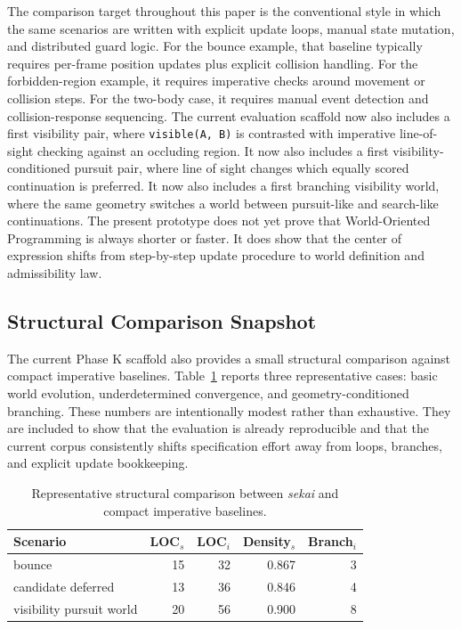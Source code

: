 The comparison target throughout this paper is the conventional style in which the same scenarios are written with explicit update loops, manual state mutation, and distributed guard logic.
For the bounce example, that baseline typically requires per-frame position updates plus explicit collision handling.
For the forbidden-region example, it requires imperative checks around movement or collision steps.
For the two-body case, it requires manual event detection and collision-response sequencing.
The current evaluation scaffold now also includes a first visibility pair, where \texttt{visible(A, B)} is contrasted with imperative line-of-sight checking against an occluding region.
It now also includes a first visibility-conditioned pursuit pair, where line of sight changes which equally scored continuation is preferred.
It now also includes a first branching visibility world, where the same geometry switches a world between pursuit-like and search-like continuations.
The present prototype does not yet prove that World-Oriented Programming is always shorter or faster.
It does show that the center of expression shifts from step-by-step update procedure to world definition and admissibility law.

\subsection{Structural Comparison Snapshot}

The current Phase K scaffold also provides a small structural comparison against compact imperative baselines.
Table~\ref{tab:baseline-snapshot} reports three representative cases: basic world evolution, underdetermined convergence, and geometry-conditioned branching.
These numbers are intentionally modest rather than exhaustive.
They are included to show that the evaluation is already reproducible and that the current corpus consistently shifts specification effort away from loops, branches, and explicit update bookkeeping.

\begin{table}[t]
  \caption{Representative structural comparison between \emph{sekai} and compact imperative baselines.}
  \label{tab:baseline-snapshot}
  \centering
  \small
  \begin{tabular}{lrrrr}
    \toprule
    Scenario & LOC$_s$ & LOC$_i$ & Density$_s$ & Branch$_i$ \\
    \midrule
    bounce & 15 & 32 & 0.867 & 3 \\
    candidate deferred & 13 & 36 & 0.846 & 4 \\
    visibility pursuit world & 20 & 56 & 0.900 & 8 \\
    \bottomrule
  \end{tabular}
\end{table}

